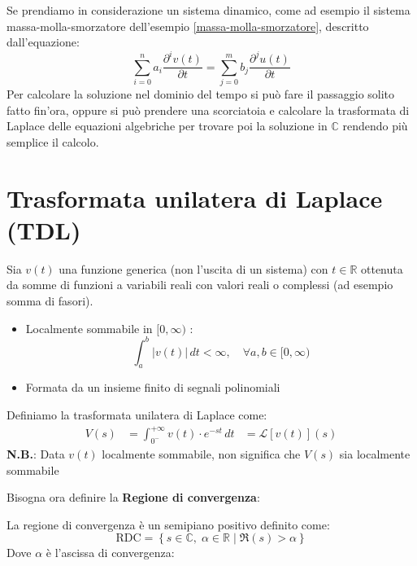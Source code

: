 \documentclass[a4paper]{article}
\begin{document}
\begin{example}
  Se prendiamo in considerazione un sistema dinamico, come ad esempio il sistema
  massa-molla-smorzatore dell'esempio \ref{massa-molla-smorzatore}, 
  descritto dall'equazione:
  \[
     \sum_{i=0}^{n} a_i \frac{\partial^{i} v(t)}{\partial t} = \sum_{j=0}^{m} b_j \frac{\partial^{j} u(t)}{\partial t}
  \] 
  Per calcolare la soluzione nel dominio del tempo si può fare il passaggio solito fatto fin'ora,
  oppure si può prendere una scorciatoia e calcolare la trasformata di Laplace delle equazioni
  algebriche per trovare poi la soluzione in \( \mathbb{C} \) rendendo più semplice il calcolo.
\end{example}

\section{Trasformata unilatera di Laplace (TDL)}
\begin{definition}
  Sia \( v(t) \) una funzione generica (non l'uscita di un sistema) con
  \( t \in \mathbb{R} \) ottenuta da somme di funzioni a variabili reali con valori 
  reali o complessi (ad esempio somma di fasori).
  \begin{itemize}
    \item Localmente sommabile in \( [0,\infty) \) :
      \[
        \int_a^b \left| v(t) \right| \, dt < \infty, \quad \forall a,b \in [0,\infty)
      \] 

    \item Formata da un insieme finito di segnali polinomiali
  \end{itemize}
  Definiamo la trasformata unilatera di Laplace come:
  \[
    \begin{aligned}
      V(s) &= \int_{0^-}^{+\infty} v(t) \cdot e^{-st} \, dt
           &= \mathcal{L}[v(t)](s)
    \end{aligned}
  \] 
  \textbf{N.B.}: Data \( v(t) \) localmente sommabile, non significa che \( V(s) \) sia 
  localmente sommabile
\end{definition}
Bisogna ora definire la \textbf{Regione di convergenza}:
\begin{definition}
  La regione di convergenza è un semipiano positivo definito come:
  \[
    \text{RDC} = \left\{ s \in \mathbb{C},\; \alpha \in \mathbb{R} \; | \; \Re(s) > \alpha \right\}
  \] 
  Dove \( \alpha \) è l'ascissa di convergenza:
  \begin{figure}[H]
    \centering
  \end{figure}
\end{definition}
\end{document}
